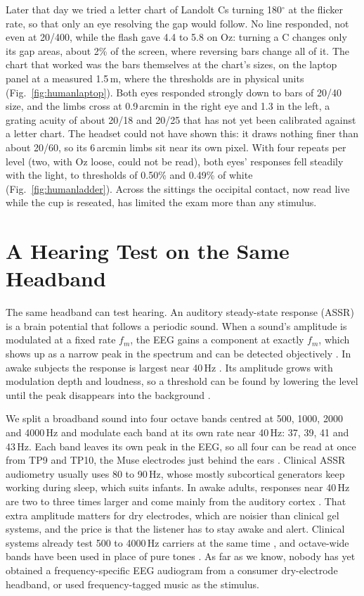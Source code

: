 \documentclass[conference]{IEEEtran}
\begin{document}
Later that day we tried a letter chart of Landolt Cs turning 180$^\circ$ at the flicker rate, so that only an eye resolving the gap would follow. No line responded, not even at 20/400, while the flash gave 4.4 to 5.8 on Oz: turning a C changes only its gap areas, about 2\% of the screen, where reversing bars change all of it. The chart that worked was the bars themselves at the chart's sizes, on the laptop panel at a measured 1.5\,m, where the thresholds are in physical units (Fig.~\ref{fig:humanlaptop}). Both eyes responded strongly down to bars of 20/40 size, and the limbs cross at 0.9\,arcmin in the right eye and 1.3 in the left, a grating acuity of about 20/18 and 20/25 that has not yet been calibrated against a letter chart. The headset could not have shown this: it draws nothing finer than about 20/60, so its 6\,arcmin limbs sit near its own pixel. With four repeats per level (two, with Oz loose, could not be read), both eyes' responses fell steadily with the light, to thresholds of 0.50\% and 0.49\% of white (Fig.~\ref{fig:humanladder}). Across the sittings the occipital contact, now read live while the cup is reseated, has limited the exam more than any stimulus.

\section{A Hearing Test on the Same Headband}\label{sec:hearing}
The same headband can test hearing. An auditory steady-state response (ASSR) is a brain potential that follows a periodic sound. When a sound's amplitude is modulated at a fixed rate $f_m$, the EEG gains a component at exactly $f_m$, which shows up as a narrow peak in the spectrum and can be detected objectively \cite{picton2003assr}. In awake subjects the response is largest near 40\,Hz \cite{galambos1981}. Its amplitude grows with modulation depth and loudness, so a threshold can be found by lowering the level until the peak disappears into the background \cite{picton2003assr}.

We split a broadband sound into four octave bands centred at 500, 1000, 2000 and 4000\,Hz and modulate each band at its own rate near 40\,Hz: 37, 39, 41 and 43\,Hz. Each band leaves its own peak in the EEG, so all four can be read at once from TP9 and TP10, the Muse electrodes just behind the ears \cite{lins1996}. Clinical ASSR audiometry usually uses 80 to 90\,Hz, whose mostly subcortical generators keep working during sleep, which suits infants. In awake adults, responses near 40\,Hz are two to three times larger and come mainly from the auditory cortex \cite{picton2003assr,dejonckere2021}. That extra amplitude matters for dry electrodes, which are noisier than clinical gel systems, and the price is that the listener has to stay awake and alert. Clinical systems already test 500 to 4000\,Hz carriers at the same time \cite{john2004infants}, and octave-wide bands have been used in place of pure tones \cite{muhler2012}. As far as we know, nobody has yet obtained a frequency-specific EEG audiogram from a consumer dry-electrode headband, or used frequency-tagged music as the stimulus.
\end{document}

